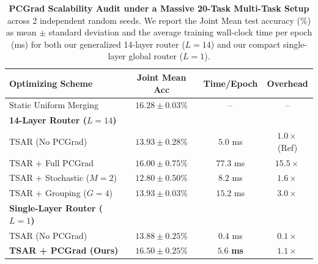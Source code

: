 \begin{table}[h]
\caption{\textbf{PCGrad Scalability Audit under a Massive 20-Task Multi-Task Setup} across 2 independent random seeds. We report the Joint Mean test accuracy (\%) as mean $\pm$ standard deviation and the average training wall-clock time per epoch (ms) for both our generalized 14-layer router ($L=14$) and our compact single-layer global router ($L=1$).}
\label{tab:pcgrad_scalability}
\vskip 0.15in
\begin{center}
\begin{small}
\begin{sc}
\begin{tabular}{lccc}
\toprule
Optimizing Scheme & Joint Mean Acc & Time/Epoch & Overhead \\
\midrule
Static Uniform Merging & $16.28 \pm 0.03\%$ & -- & -- \\
\midrule
\textbf{14-Layer Router ($L=14$)} & & & \\
TSAR (No PCGrad) & $13.93 \pm 0.28\%$ & $5.0$ ms & $1.0\times$ (Ref) \\
TSAR + Full PCGrad & $16.00 \pm 0.75\%$ & $77.3$ ms & $15.5\times$ \\
TSAR + Stochastic ($M=2$) & $12.80 \pm 0.50\%$ & $8.2$ ms & $1.6\times$ \\
TSAR + Grouping ($G=4$) & $13.93 \pm 0.03\%$ & $15.2$ ms & $3.0\times$ \\
\midrule
\textbf{Single-Layer Router ($L=1$)} & & & \\
TSAR (No PCGrad) & $13.88 \pm 0.25\%$ & $0.4$ ms & $0.1\times$ \\
\textbf{TSAR + PCGrad (Ours)} & $\mathbf{16.50 \pm 0.25\%}$ & $\mathbf{5.6}$ \textbf{ms} & $\mathbf{1.1\times}$ \\
\bottomrule
\end{tabular}
\end{sc}
\end{small}
\end{center}
\vskip -0.1in
\end{table}

